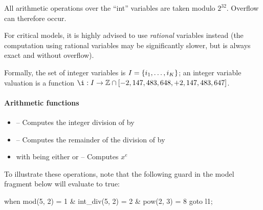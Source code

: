 \begin{becareful}
	All arithmetic operations over the ``int'' variables are taken modulo $2^{32}$.
	Overflow can therefore occur.

	For critical models, it is highly advised to use \emph{rational} variables instead (the computation using rational variables may be significantly slower, but is always exact and without overflow).
\end{becareful}

Formally, the set of integer variables is $I = \{ i_1, \dots, i_K \} $;
an integer variable valuation is a function $\ival : \IVar \rightarrow \setZ \cap \left[-2,147,483,648, +2,147,483,647\right]$.



\paragraph{Arithmetic functions}

\begin{itemize}
	\item \label{item:lbl-int_div}  -- Computes the integer division of  by~
\end{itemize}

\begin{itemize}
	\item \label{item:lbl-mod}  -- Computes the remainder of the division of  by~
\end{itemize}

\begin{itemize}
    \item \label{item:lbl-pow}  with  being either  or  -- Computes $x^e$
\end{itemize}

\begin{example}
	To illustrate these operations, note that the following guard in the model fragment below will evaluate to true:

	\begin{IMITATORmodel}
		when mod(5, 2) = 1 & int_div(5, 2) = 2 & pow(2, 3) = 8 goto l1;
	\end{IMITATORmodel}
\end{example}

